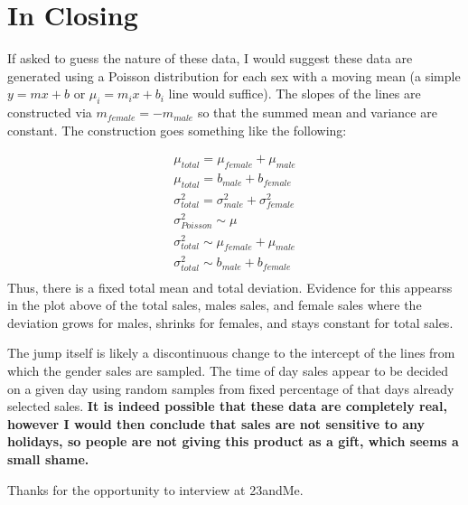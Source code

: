 \documentclass{article}[12pt]
\begin{document}
\section{In Closing}
If asked to guess the nature of these data,
I would suggest these data are generated using a Poisson distribution for each sex with a moving mean (a simple $y=mx+b$ or $\mu_i=m_ix + b_i$ line would suffice). The slopes of the lines are constructed via $m_{female}=-m_{male}$ so that the summed mean and variance are constant. The construction goes something like the following:

\begin{align}
\mu_{total} = \mu_{female} + \mu_{male}\\
\mu_{total} = b_{male} + b_{female}\\
\sigma^2_{total} = \sigma^2_{male} + \sigma^2_{female} \\
\sigma^2_{Poisson} \sim \mu \\
\sigma^2_{total} \sim \mu_{female} + \mu_{male}\\
\sigma^2_{total} \sim b_{male} + b_{female}\\ \nonumber
\end{align}
\noindent
Thus, there is a fixed total mean and total deviation.
Evidence for this appearss
in the plot above of the total sales, males sales, and female sales where the deviation grows for males, shrinks for females, and stays constant for total sales. 


The jump itself is likely a discontinuous change to the intercept of the lines
from which the gender sales are sampled. The time of day sales appear to be decided on a given day using random samples from fixed
percentage of that days already selected sales. {\bf It is indeed possible that these data are completely real, however I would
then conclude that sales are not sensitive to any holidays, so people are not giving
this product as a gift, which seems a small shame.}


Thanks for the opportunity to interview at 23andMe.
\end{document}
